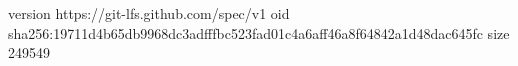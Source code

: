 version https://git-lfs.github.com/spec/v1
oid sha256:19711d4b65db9968dc3adfffbc523fad01c4a6aff46a8f64842a1d48dac645fc
size 249549
